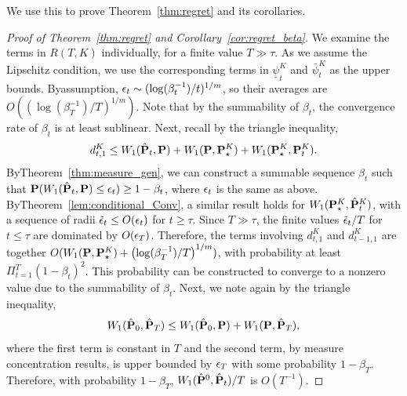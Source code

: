 We use this to prove Theorem~\ref{thm:regret} and its corollaries. 
\begin{proof}[Proof of Theorem~\ref{thm:regret} and Corollary~\ref{cor:regret_beta}]
We examine the terms in $R(T,K)$ individually, for a finite value $T \gg \tau$.
As we assume the Lipschitz condition, we use the corresponding terms in $\underline{\psi}^K_{t}$ and $\bar{\psi}^K_t$ as the upper bounds. 
Byassumption, $\epsilon_t\sim (\log(\beta_t^{-1})/t)^{1/m}$, so their averages are $O((\log(\beta_T^{-1})/T)^{1/m}).$
Note that by the summability of $\beta_t$, the convergence rate of $\beta_t$ is at least sublinear. 
Next, recall by the triangle inequality,  $$d^K_{t,1} \leq W_1(\hat{{\mathbf P}}_t,{\mathbf P}) + W_1({\mathbf P},{\mathbf P}^K_\star) + W_1({\mathbf P}^K_\star,{\mathbf P}^K_{t}).$$ ByTheorem~\ref{thm:measure_gen}, we can construct a summable sequence $\beta_t$ such that ${\mathbf P}(W_1(\hat{{\mathbf P}}_t,{\mathbf P}) \leq \epsilon_t) \geq  1-\beta_t$, where $\epsilon_t$ is the same as above. ByTheorem~\ref{lem:conditional_Conv}, a similar result holds for $W_1({\mathbf P}^K_\star,\hat{{\mathbf P}}^K_t)$, with a sequence of radii $\tilde{\epsilon}_t\leq O(\epsilon_t)$ for $t \geq \tau$. Since $T \gg \tau$, the finite values $\tilde{\epsilon}_t/T$ for $t\leq \tau$ are dominated by $O(\epsilon_T)$.
Therefore, the terms involving $d^K_{t,1}$ and $d^K_{t-1,1}$ are together $O(W_1({\mathbf P},{\mathbf P}^K_\star) + \left(\log(\beta_{T}^{-1})/T\right)^{1/m})$, with probability at least $\Pi_{t=1}^{T}(1-\beta_t)^2$. This probability can be constructed to converge to a nonzero value due to the summability of $\beta_t$. 
Next, we note again by the triangle inequality, $$W_1(\hat{{\mathbf P}}_0,\hat{{\mathbf P}}_T) \leq W_1(\hat{{\mathbf P}}_0,{\mathbf P}) + W_1({\mathbf P},\hat{{\mathbf P}}_T),$$
where the first term is constant in $T$ and the second term, by measure concentration results, is upper bounded by $\epsilon_T$ with some probability $1-\beta_T$. Therefore, with probability $1-\beta_T$, $W_1(\hat{{\mathbf P}}^0,\hat{{\mathbf P}}_t)/T$ is $O(T^{-1})$.

\end{proof}
